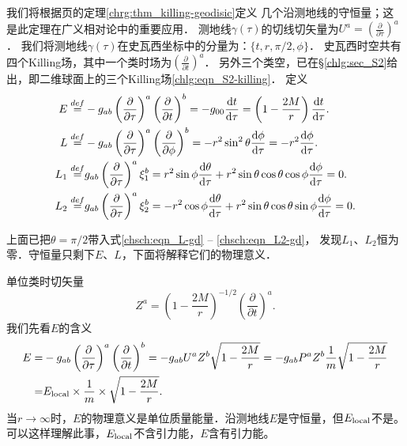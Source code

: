 我们将根据\pageref{chrg:thm_killing-geodisic}页的定理\ref{chrg:thm_killing-geodisic}定义
几个沿测地线的守恒量；这是此定理在广义相对论中的重要应用．
测地线$\gamma(\tau)$的切线切矢量为$U^a=( \frac{\partial }{\partial \tau} )^a$．
我们将测地线$\gamma(\tau)$在史瓦西坐标中的分量为：$\{t,r,\pi/2,\phi\}$．
史瓦西时空共有四个Killing场，其中一个类时场为$( \frac{\partial }{\partial t} )^a$．
另外三个类空，已在\S\ref{chlg:sec_S2}给出，即二维球面上的三个Killing场\eqref{chlg:eqn_S2-killing}．
定义
\begin{align}
    E\overset{def}{=} & -g_{ab} \left( \frac{\partial }{\partial \tau} \right)^a
    \left( \frac{\partial }{\partial t} \right)^b
    =-g_{00} \frac{{\rm d} t}{{\rm d} \tau}
    = \left(1-\frac{2 M}{ r}\right) \frac{{\rm d} t}{{\rm d} \tau}. \label{chsch:eqn_E-gd} \\
    L\overset{def}{=} & -g_{ab} \left( \frac{\partial }{\partial \tau} \right)^a
    \left( \frac{\partial }{\partial \phi} \right)^b
    =-r^2 \sin^2\theta \frac{{\rm d} \phi}{{\rm d} \tau}
    =-r^2  \frac{{\rm d} \phi}{{\rm d} \tau}. \label{chsch:eqn_L-gd} \\
    L_1 \overset{def}{=} & g_{ab} \left( \frac{\partial }{\partial \tau} \right)^a \xi_1^b
    = r^2 \sin \phi\frac{{\rm d} \theta}{{\rm d} \tau} + r^2 \sin\theta \cos\theta \cos\phi
     \frac{{\rm d} \phi}{{\rm d} \tau}=0.     \label{chsch:eqn_L1-gd} \\
    L_2 \overset{def}{=} & g_{ab} \left( \frac{\partial }{\partial \tau} \right)^a \xi_2^b
    = -r^2 \cos \phi \frac{{\rm d} \theta}{{\rm d} \tau}+ r^2 \sin\theta \cos\theta \sin\phi
    \frac{{\rm d} \phi}{{\rm d} \tau}=0.      \label{chsch:eqn_L2-gd} 
\end{align}


上面已把$\theta=\pi/2$带入式\eqref{chsch:eqn_L-gd} -- \eqref{chsch:eqn_L2-gd}， 
发现$L_1$、$L_2$恒为零．守恒量只剩下$E$、$L$，下面将解释它们的物理意义．

单位类时切矢量
\begin{equation}
	Z^a = \left(1-\frac{2M}{r}\right)^{-1/2} \left( \frac{\partial }{\partial t} \right)^a .
\end{equation}
我们先看$E$的含义
\begin{align*}
	E=&-g_{ab} \left( \frac{\partial }{\partial \tau} \right)^a
	\left( \frac{\partial }{\partial t} \right)^b
	=-g_{ab} U^a Z^b \sqrt{1-\frac{2M}{r}} 
	=-g_{ab} P^a Z^b \frac{1}{m}\sqrt{1-\frac{2M}{r}}  \\
	=& E_{\rm local} \times \frac{1}{m} \times \sqrt{1-\frac{2M}{r}}.
\end{align*}
当$r\to \infty$时，$E$的物理意义是单位质量能量．沿测地线$E$是守恒量，但$E_{\rm local}$不是。
可以这样理解此事，$E_{\rm local}$不含引力能，$E$含有引力能。

